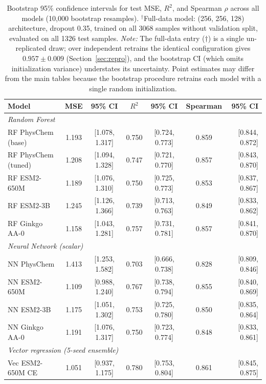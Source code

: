 \documentclass[12pt]{article}
\begin{document}
\begin{table}[H]
\centering
\caption{Bootstrap 95\% confidence intervals for test MSE, $R^2$, and Spearman $\rho$ across all models (10{,}000 bootstrap resamples). $^\dagger$Full-data model: (256, 256, 128) architecture, dropout 0.35, trained on all 3068 samples without validation split, evaluated on all 1326 test samples. \textit{Note:} The full-data entry ($\dagger$) is a single un-replicated draw; over independent retrains the identical configuration gives $0.957 \pm 0.009$ (Section~\ref{sec:repro}), and the bootstrap CI (which omits initialization variance) understates its uncertainty. Point estimates may differ from the main tables because the bootstrap procedure retrains each model with a single random initialization.}
\label{tab:bootstrap}
\small
\setlength{\tabcolsep}{4pt}
\begin{tabular}{lcccccr}
\toprule
Model & MSE & 95\% CI & $R^2$ & 95\% CI & Spearman & 95\% CI \\
\midrule
\multicolumn{7}{l}{\textit{Random Forest}} \\
RF PhysChem (base) & 1.193 & [1.078, 1.317] & 0.750 & [0.724, 0.773] & 0.859 & [0.844, 0.872] \\
RF PhysChem (tuned) & 1.208 & [1.094, 1.328] & 0.747 & [0.721, 0.770] & 0.857 & [0.843, 0.870] \\
RF ESM2-650M & 1.189 & [1.076, 1.310] & 0.750 & [0.725, 0.773] & 0.853 & [0.837, 0.867] \\
RF ESM2-3B & 1.245 & [1.126, 1.366] & 0.739 & [0.713, 0.763] & 0.849 & [0.833, 0.862] \\
RF Ginkgo AA-0 & 1.158 & [1.043, 1.281] & 0.757 & [0.731, 0.781] & 0.857 & [0.841, 0.870] \\
\midrule
\multicolumn{7}{l}{\textit{Neural Network (scalar)}} \\
NN PhysChem & 1.413 & [1.253, 1.582] & 0.703 & [0.666, 0.738] & 0.828 & [0.809, 0.846] \\
NN ESM2-650M & 1.109 & [0.988, 1.240] & 0.767 & [0.738, 0.794] & 0.855 & [0.840, 0.869] \\
NN ESM2-3B & 1.175 & [1.051, 1.302] & 0.753 & [0.725, 0.780] & 0.850 & [0.835, 0.864] \\
NN Ginkgo AA-0 & 1.191 & [1.076, 1.317] & 0.750 & [0.723, 0.774] & 0.848 & [0.833, 0.861] \\
\midrule
\multicolumn{7}{l}{\textit{Vector regression (5-seed ensemble)}} \\
Vec ESM2-650M CE & 1.051 & [0.937, 1.175] & 0.780 & [0.753, 0.804] & 0.861 & [0.845, 0.875] \\

\end{tabular}
\end{table}
\end{document}
